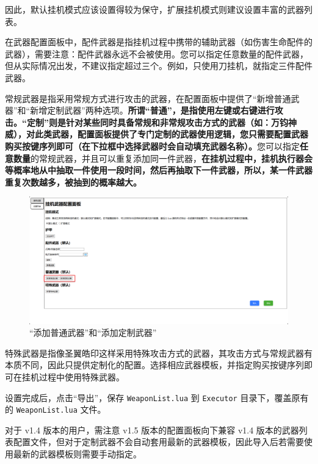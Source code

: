 因此，默认挂机模式应该设置得较为保守，扩展挂机模式则建议设置丰富的武器列表。

在武器配置面板中，配件武器是指挂机过程中携带的辅助武器（如伤害生命配件的武器），需要注意：配件武器永远不会被使用。您可以指定任意数量的配件武器，但从实际情况出发，不建议指定超过三个。例如，只使用刀挂机，就指定三件配件武器。

常规武器是指采用常规方式进行攻击的武器，在配置面板中提供了“新增普通武器”和“新增定制武器”两种选项。\textbf{\color{red}所谓“普通”，是指使用左键或右键进行攻击。“定制”则是针对某些同时具备常规和非常规攻击方式的武器（如：万钧神威），对此类武器，配置面板提供了专门定制的武器使用逻辑，您只需要配置武器购买按键序列即可（在下拉框中选择武器时会自动填充武器名称）。}您可以指定\textbf{\color{red}任意数量}的常规武器，并且可以重复添加同一件武器，\textbf{在挂机过程中，挂机执行器会等概率地从中抽取一件使用一段时间，然后再抽取下一件武器，所以，某一件武器重复次数越多，被抽到的概率越大。}

\begin{figure}[H]
    \Centering
    \includegraphics[width=\textwidth]{assets/about_conventional_weapons}
    \caption{“添加普通武器”和“添加定制武器”}
\end{figure}

特殊武器是指像圣翼皓印这样采用特殊攻击方式的武器，其攻击方式与常规武器有本质不同，因此只提供定制化的配置。选择相应武器模板，并指定购买按键序列即可在挂机过程中使用特殊武器。

设置完成后，点击“导出”，保存 \lstinline{WeaponList.lua} 到 \lstinline{Executor} 目录下，覆盖原有的 \lstinline{WeaponList.lua} 文件。

对于 v1.4 版本的用户，需注意 v1.5 版本的配置面板向下兼容 v1.4 版本的武器列表配置文件，但对于定制武器不会自动套用最新的武器模板，因此导入后若需要使用最新的武器模板则需要手动指定。

